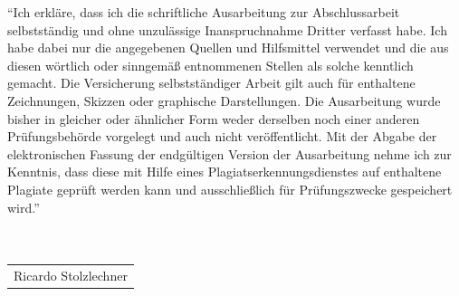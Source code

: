 \documentclass[12pt]{book}          %
\begin{document}
\enquote{Ich erkläre, dass ich die schriftliche Ausarbeitung zur Abschlussarbeit selbstständig und ohne unzulässige Inanspruchnahme Dritter verfasst habe. Ich habe dabei nur die angegebenen Quellen und Hilfsmittel verwendet und die aus diesen wörtlich oder sinngemäß entnommenen Stellen als solche kenntlich gemacht. 
Die Versicherung selbstständiger Arbeit gilt auch für enthaltene Zeichnungen, Skizzen oder graphische Darstellungen. Die Ausarbeitung wurde bisher in gleicher oder ähnlicher Form weder derselben noch einer anderen Prüfungsbehörde vorgelegt und auch nicht veröffentlicht. 
Mit der Abgabe der elektronischen Fassung der endgültigen Version der Ausarbeitung nehme ich zur Kenntnis, dass diese mit Hilfe eines Plagiatserkennungsdienstes auf enthaltene Plagiate geprüft werden kann und ausschließlich für Prüfungszwecke gespeichert wird.}\\\\\\

\begin{tabular}{@{}l@{}}\hline
Ricardo Stolzlechner
\end{tabular}\\\\\\
\end{document}
